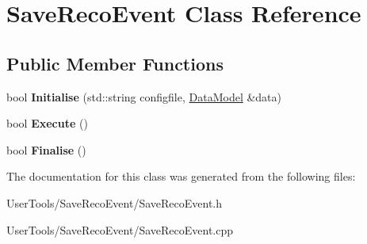 \hypertarget{classSaveRecoEvent}{
\section{SaveRecoEvent Class Reference}
\label{classSaveRecoEvent}
}
\subsection*{Public Member Functions}
\begin{DoxyCompactItemize}
\item 
\hypertarget{classSaveRecoEvent_ace0d320627ceb6057ad19fc8863e717e}{
bool {\bfseries Initialise} (std::string configfile, \hyperlink{classDataModel}{DataModel} \&data)}
\label{classSaveRecoEvent_ace0d320627ceb6057ad19fc8863e717e}

\item 
\hypertarget{classSaveRecoEvent_a6ee4a4bbf889fd92c8452c6464f36395}{
bool {\bfseries Execute} ()}
\label{classSaveRecoEvent_a6ee4a4bbf889fd92c8452c6464f36395}

\item 
\hypertarget{classSaveRecoEvent_a28a07f2ead5d5e1aa21f0b6ed9b4ab83}{
bool {\bfseries Finalise} ()}
\label{classSaveRecoEvent_a28a07f2ead5d5e1aa21f0b6ed9b4ab83}

\end{DoxyCompactItemize}


The documentation for this class was generated from the following files:\begin{DoxyCompactItemize}
\item 
UserTools/SaveRecoEvent/SaveRecoEvent.h\item 
UserTools/SaveRecoEvent/SaveRecoEvent.cpp\end{DoxyCompactItemize}
